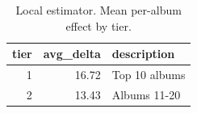 \begin{table}
\caption{Local estimator. Mean per-album effect by tier.}
\begin{tabular}{rrl}
\toprule
tier & avg\_delta & description \\
\midrule
1 & 16.72 & Top 10 albums \\
2 & 13.43 & Albums 11-20 \\
\bottomrule
\end{tabular}
\end{table}
